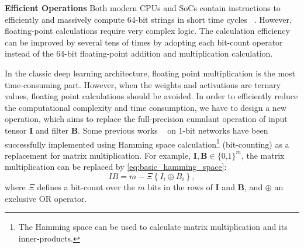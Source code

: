 \documentclass[twoside,twocolumn]{article}
\begin{document}
\noindent\textbf{Efficient Operations} Both modern CPUs and SoCs contain instructions to efficiently and massively compute 64-bit strings in short time cycles ~\cite{b49}. However, floating-point calculations require very complex logic. The calculation efficiency can be improved by several tens of times by adopting each bit-count operator instead of the 64-bit floating-point addition and multiplication calculation.

In the classic deep learning architecture, floating point multiplication is the most time-consuming part. However, when the weights and activations are ternary values, floating point calculations should be avoided. In order to efficiently reduce the computational complexity and time consumption, we have to design a new operation, which aims to replace the full-precision cumulant operation of input tensor $\mathbf{I}$ and filter $\mathbf{B}$. Some previous works ~\cite{b16,b17} on 1-bit networks have been successfully implemented using Hamming space calculation\footnote{The Hamming space can be used to calculate matrix multiplication and its inner-products.} (bit-counting) as a replacement for matrix multiplication. For example, $\mathbf{I,B}\in \text{\{0,1\}}^m$, the matrix multiplication can be replaced by \eqref{eq:basic_hamming_space}:
\begin{equation}\label{eq:basic_hamming_space}
IB=m-\varXi \left\{ I_i\oplus B_i \right\},
\end{equation}
where $\varXi$ defines a bit-count over the $m$ bits in the rows of $\mathbf{I}$ and $\mathbf{B}$, and $\oplus$ an exclusive OR operator.
\end{document}
